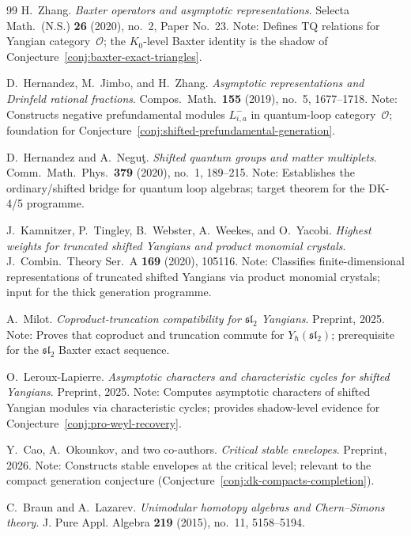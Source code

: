\begin{thebibliography}{99}
H.~Zhang.
\textit{Baxter operators and asymptotic representations}.
Selecta Math.\ (N.S.) \textbf{26} (2020), no.~2, Paper No.~23.
Note: Defines TQ relations for Yangian category~$\mathcal{O}$;
the $K_0$-level Baxter identity is the shadow of
Conjecture~\ref{conj:baxter-exact-triangles}.

D.~Hernandez, M.~Jimbo, and H.~Zhang.
\textit{Asymptotic representations and Drinfeld rational fractions}.
Compos.\ Math.\ \textbf{155} (2019), no.~5, 1677--1718.
Note: Constructs negative prefundamental modules $L^-_{i,a}$ in
quantum-loop category~$\mathcal{O}$; foundation for
Conjecture~\ref{conj:shifted-prefundamental-generation}.

D.~Hernandez and A.~Negu\c{t}.
\textit{Shifted quantum groups and matter multiplets}.
Comm.\ Math.\ Phys.\ \textbf{379} (2020), no.~1, 189--215.
Note: Establishes the ordinary/shifted bridge for quantum loop algebras;
target theorem for the DK-4/5 programme.

J.~Kamnitzer, P.~Tingley, B.~Webster, A.~Weekes, and O.~Yacobi.
\textit{Highest weights for truncated shifted Yangians and product
monomial crystals}.
J.~Combin.\ Theory Ser.~A \textbf{169} (2020), 105116.
Note: Classifies finite-dimensional representations of truncated
shifted Yangians via product monomial crystals; input for the
thick generation programme.

A.~Milot.
\textit{Coproduct-truncation compatibility for $\mathfrak{sl}_2$ Yangians}.
Preprint, 2025.
Note: Proves that coproduct and truncation commute for
$Y_\hbar(\mathfrak{sl}_2)$; prerequisite for the $\mathfrak{sl}_2$
Baxter exact sequence.

O.~Leroux-Lapierre.
\textit{Asymptotic characters and characteristic cycles for
shifted Yangians}.
Preprint, 2025.
Note: Computes asymptotic characters of shifted Yangian modules
via characteristic cycles; provides shadow-level evidence for
Conjecture~\ref{conj:pro-weyl-recovery}.

Y.~Cao, A.~Okounkov, and two co-authors.
\textit{Critical stable envelopes}.
Preprint, 2026.
Note: Constructs stable envelopes at the critical level; relevant
to the compact generation conjecture
(Conjecture~\ref{conj:dk-compacts-completion}).

C.~Braun and A.~Lazarev.
\textit{Unimodular homotopy algebras and Chern--Simons theory}.
J. Pure Appl. Algebra \textbf{219} (2015), no.~11, 5158--5194.


\end{thebibliography}
